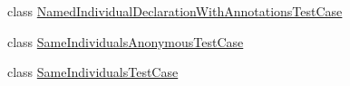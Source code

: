 \begin{DoxyCompactItemize}
\item 
class \hyperlink{classorg_1_1semanticweb_1_1owlapi_1_1api_1_1test_1_1individuals_1_1_named_individual_declaration_with_annotations_test_case}{Named\-Individual\-Declaration\-With\-Annotations\-Test\-Case}
\item 
class \hyperlink{classorg_1_1semanticweb_1_1owlapi_1_1api_1_1test_1_1individuals_1_1_same_individuals_anonymous_test_case}{Same\-Individuals\-Anonymous\-Test\-Case}
\item 
class \hyperlink{classorg_1_1semanticweb_1_1owlapi_1_1api_1_1test_1_1individuals_1_1_same_individuals_test_case}{Same\-Individuals\-Test\-Case}
\end{DoxyCompactItemize}
